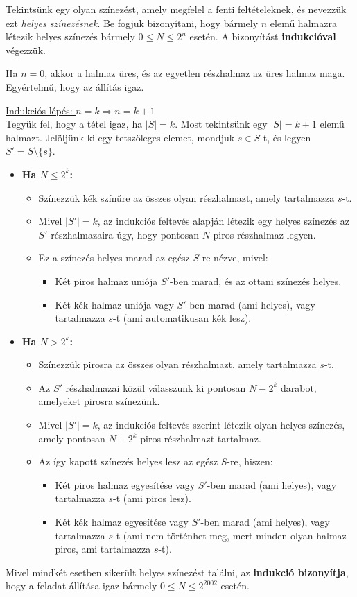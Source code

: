 \begin{solution}
Tekintsünk egy olyan színezést, amely megfelel a fenti feltételeknek,
és nevezzük ezt \textit{helyes színezésnek}. Be fogjuk bizonyítani,
hogy bármely $n$ elemű halmazra létezik helyes színezés bármely $0\leq N\leq2^{n}$
esetén. A bizonyítást \textbf{indukcióval} végezzük.

Ha $n=0$, akkor a halmaz üres, és az egyetlen részhalmaz az üres
halmaz maga. Egyértelmű, hogy az állítás igaz.

\underline{Indukciós lépés: $n=k\Rightarrow n=k+1$}\\

Tegyük fel, hogy a tétel igaz, ha $|S|=k$. Most tekintsünk egy $|S|=k+1$
elemű halmazt. Jelöljünk ki egy tetszőleges elemet, mondjuk $s\in S$-t,
és legyen $S'=S\setminus\{s\}$.
\begin{itemize}
\item \textbf{Ha $N\leq2^{k}$:} 
\begin{itemize}
\item Színezzük kék színűre az összes olyan részhalmazt, amely tartalmazza
$s$-t. 
\item Mivel $|S'|=k$, az indukciós feltevés alapján létezik egy helyes
színezés az $S'$ részhalmazaira úgy, hogy pontosan $N$ piros részhalmaz
legyen. 
\item Ez a színezés helyes marad az egész $S$-re nézve, mivel: 
\begin{itemize}
\item Két piros halmaz uniója $S'$-ben marad, és az ottani színezés helyes. 
\item Két kék halmaz uniója vagy $S'$-ben marad (ami helyes), vagy tartalmazza
$s$-t (ami automatikusan kék lesz). 
\end{itemize}
\end{itemize}
\item \textbf{Ha $N>2^{k}$:} 
\begin{itemize}
\item Színezzük pirosra az összes olyan részhalmazt, amely tartalmazza $s$-t. 
\item Az $S'$ részhalmazai közül válasszunk ki pontosan $N-2^{k}$ darabot,
amelyeket pirosra színezünk. 
\item Mivel $|S'|=k$, az indukciós feltevés szerint létezik olyan helyes
színezés, amely pontosan $N-2^{k}$ piros részhalmazt tartalmaz. 
\item Az így kapott színezés helyes lesz az egész $S$-re, hiszen: 
\begin{itemize}
\item Két piros halmaz egyesítése vagy $S'$-ben marad (ami helyes), vagy
tartalmazza $s$-t (ami piros lesz). 
\item Két kék halmaz egyesítése vagy $S'$-ben marad (ami helyes), vagy
tartalmazza $s$-t (ami nem történhet meg, mert minden olyan halmaz
piros, ami tartalmazza $s$-t). 
\end{itemize}
\end{itemize}
\end{itemize}
Mivel mindkét esetben sikerült helyes színezést találni, az \textbf{indukció
bizonyítja}, hogy a feladat állítása igaz bármely $0\leq N\leq2^{2002}$
esetén. 
\end{solution}

